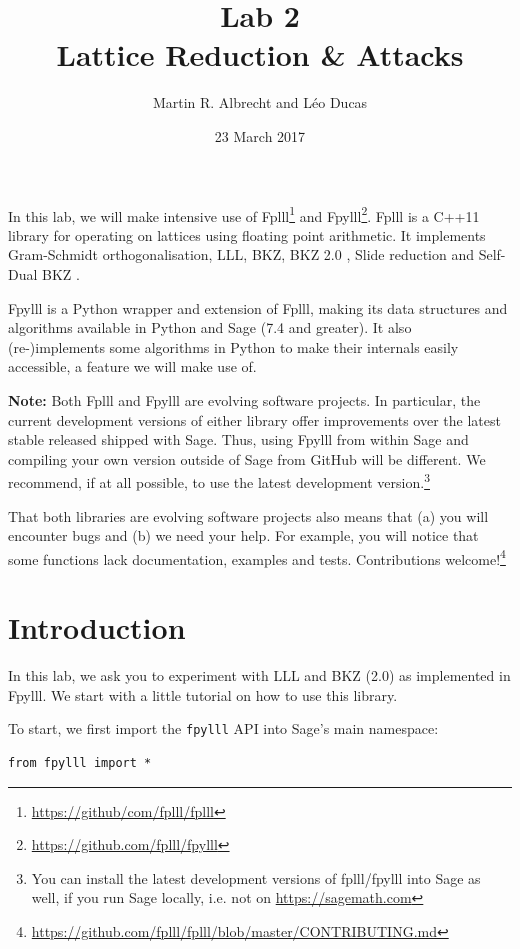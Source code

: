 \documentclass[10pt,a4paper,nobib]{tufte-handout}
\author{Martin R. Albrecht and Léo Ducas}
\date{23 March 2017}
\title{Lab 2\\\medskip
\large Lattice Reduction \& Attacks}
\begin{document}
\maketitle
In this lab, we will make intensive use of Fplll\footnote{\url{https://github/com/fplll/fplll}} and Fpylll\footnote{\url{https://github.com/fplll/fpylll}}. Fplll is a C++11 library for operating on lattices using floating point arithmetic. It implements Gram-Schmidt orthogonalisation, LLL, BKZ, BKZ 2.0 , Slide reduction  and Self-Dual BKZ .

Fpylll is a Python wrapper and extension of Fplll, making its data structures and algorithms available in Python and Sage (7.4 and greater). It also (re-)implements some algorithms in Python to make their internals easily accessible, a feature we will make use of.

\textbf{Note:} Both Fplll and Fpylll are evolving software projects. In particular, the current development versions of either library offer improvements over the latest stable released shipped with Sage. Thus, using Fpylll from within Sage and compiling your own version outside of Sage from GitHub will be different. We recommend, if at all possible, to use the latest development version.\footnote{You can install the latest development versions of fplll/fpylll into Sage as well, if you run Sage locally, i.e. not on \url{https://sagemath.com}}

That both libraries are evolving software projects also means that (a) you will encounter bugs and (b) we need your help. For example, you will notice that some functions lack documentation, examples and tests. Contributions welcome!\footnote{\url{https://github.com/fplll/fplll/blob/master/CONTRIBUTING.md}}

\section{Introduction}
\label{sec:orgb108606}
In this lab, we ask you to experiment with LLL and BKZ (2.0) as implemented in Fpylll. We start with a little tutorial on how to use this library. 

To start, we first import the \texttt{fpylll} API into Sage’s main namespace:

\lstset{language=sage,label= ,caption= ,captionpos=b,numbers=none}
\begin{lstlisting}
from fpylll import *
\end{lstlisting}
\end{document}
